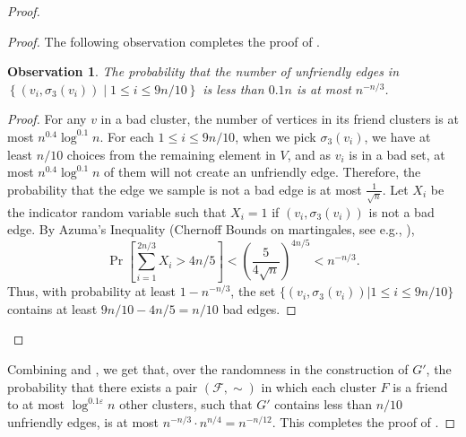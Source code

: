 \documentclass[11pt]{article}
\newtheorem{observation}[theorem]{Observation}
\theoremstyle{definition}
\newcommand{\set}[1]{\left\{ #1 \right\}}
\newcommand{\fset}{{\mathcal{F}}}
\newcommand{\eps}{{\varepsilon}}
\begin{document}
\begin{proof}
\begin{proof}
The following observation completes the proof of .

\begin{observation}
The probability that the number of unfriendly edges in $\set{(v_i,\sigma_3(v_i))\mid 1\le i\le 9n/10}$ is less than $0.1n$ is at most $n^{-n/3}$.
\end{observation}
\begin{proof}
For any $v$ in a bad cluster, the number of vertices in its friend clusters is at most $n^{0.4} \log^{0.1} n$. 
    For each $1\le i\le 9n/10$, when we pick $\sigma_3(v_i)$, we have at least $n/10$ choices from the remaining element in $V$, and as $v_i$ is in a bad set, at most $n^{0.4} \log^{0.1} n$ of them will not create an unfriendly edge. Therefore, the probability that the edge we sample is not a bad edge is at most $\frac{1}{\sqrt{n}}$. Let $X_i$ be the indicator random variable such that $X_i = 1$ if $(v_i,\sigma_3(v_i))$ is not a bad edge. By Azuma's Inequality (Chernoff Bounds on martingales, see e.g., \cite{kuszmaul2021multiplicative}), 
    $$
        \Pr \left[ \sum_{i=1}^{2n/3} X_i > 4n/5 \right] < \left( \frac{5}{4\sqrt{n}} \right)^{4n/5} < n^{-n/3}.
    $$
    Thus, with probability at least $1-n^{-n/3}$, the set $\{(v_i,\sigma_3(v_i)) | 1 \le i \le 9n/10\}$ contains at least $9n/10-4n/5 = n/10$ bad edges.
\end{proof}
\end{proof}

Combining  and , we get that, over the randomness in the construction of $G'$, the probability that there exists a pair $(\fset,\sim)$ in which each cluster $F$ is a friend to at most $\log^{0.1\eps} n$ other clusters, such that $G'$ contains less than $n/10$ unfriendly edges, is at most $n^{-n/3}\cdot n^{n/4}=n^{-n/12}$.
This completes the proof of .
\end{proof}
\end{document}
